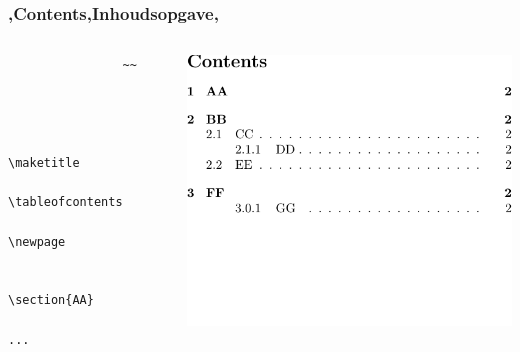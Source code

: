 \begin{frame}[fragile]
    \frametitle{\lang,Contents,Inhoudsopgave,}
    
    \begin{columns}
        \begin{column}{0.5\textwidth}
            \begin{verbatim}
                ~~

                
                
                    \maketitle
                    \tableofcontents
                    \newpage
                    
                    \section{AA}
                    ...
                
            \end{verbatim}
        \end{column}
        \begin{column}{0.5\textwidth}
            \includegraphics[width=\linewidth,height=0.8\textheight,keepaspectratio,page=1]{assets/tableofcontentswholepage.pdf}
            \vspace{-60pt}
        \end{column}
    \end{columns}
\end{frame}

